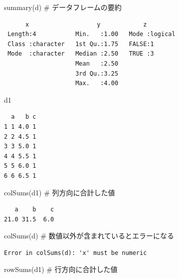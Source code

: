 \documentclass[
  letterpaper,
  DIV=11,
  numbers=noendperiod]{scrreprt}
\newenvironment{Shaded}{\begin{snugshade}}{\end{snugshade}}
\newcommand{\CommentTok}[1]{\textcolor[rgb]{0.37,0.37,0.37}{#1}}
\newcommand{\FunctionTok}[1]{\textcolor[rgb]{0.28,0.35,0.67}{#1}}
\newcommand{\NormalTok}[1]{\textcolor[rgb]{0.00,0.23,0.31}{#1}}
\begin{document}
\begin{Shaded}
\begin{Highlighting}[]
\FunctionTok{summary}\NormalTok{(d) }\CommentTok{\# データフレームの要約}
\end{Highlighting}
\end{Shaded}

\begin{verbatim}
      x                   y            z          
 Length:4           Min.   :1.00   Mode :logical  
 Class :character   1st Qu.:1.75   FALSE:1        
 Mode  :character   Median :2.50   TRUE :3        
                    Mean   :2.50                  
                    3rd Qu.:3.25                  
                    Max.   :4.00                  
\end{verbatim}

\begin{Shaded}
\begin{Highlighting}[]
\NormalTok{d1}
\end{Highlighting}
\end{Shaded}

\begin{verbatim}
  a   b c
1 1 4.0 1
2 2 4.5 1
3 3 5.0 1
4 4 5.5 1
5 5 6.0 1
6 6 6.5 1
\end{verbatim}

\begin{Shaded}
\begin{Highlighting}[]
\FunctionTok{colSums}\NormalTok{(d1) }\CommentTok{\# 列方向に合計した値}
\end{Highlighting}
\end{Shaded}

\begin{verbatim}
   a    b    c 
21.0 31.5  6.0 
\end{verbatim}

\begin{Shaded}
\begin{Highlighting}[]
\FunctionTok{colSums}\NormalTok{(d) }\CommentTok{\# 数値以外が含まれているとエラーになる}
\end{Highlighting}
\end{Shaded}

\begin{verbatim}
Error in colSums(d): 'x' must be numeric
\end{verbatim}

\begin{Shaded}
\begin{Highlighting}[]
\FunctionTok{rowSums}\NormalTok{(d1) }\CommentTok{\# 行方向に合計した値}
\end{Highlighting}
\end{Shaded}
\end{document}

